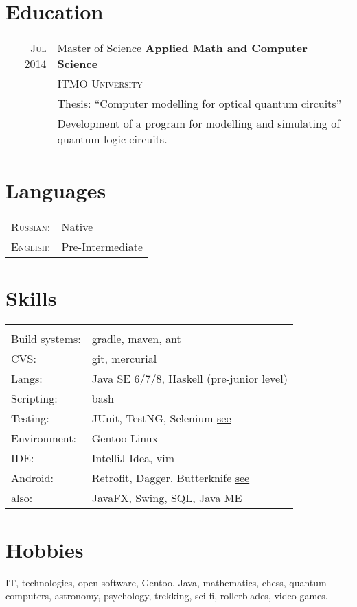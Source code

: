 \documentclass[a4paper,11pt]{article}
\begin{document}
\section{Education}
	\begin{tabular}{rl}	
	  \textsc{Jul 2014} & Master of Science \textbf{ Applied Math and Computer Science} \\& \textsc{ITMO University}\\
			& Thesis: ``Computer modelling for optical quantum circuits''\\&
			Development of a program for modelling and simulating of quantum logic circuits.
	\end{tabular}

\section{Languages}
	\begin{tabular}{ll}
		\textsc{Russian:}&Native\\
		\textsc{English:}&Pre-Intermediate\\
	\end{tabular}

\section{Skills}
	\begin{tabular}{ll}
		\multicolumn{2}{c}{} \\
			Build systems: 	& gradle, maven, ant \\
			CVS: 		& git, mercurial \\
			Langs: 		& Java SE 6/7/8, Haskell (pre-junior level)\\
			Scripting: 	& bash \\ 
			Testing: 	& JUnit, TestNG, Selenium \href{https://github.com/dbudyak/TestRush}{see}\\
			Environment: 	& Gentoo Linux \\
			IDE: 		& IntelliJ Idea, vim \\
			Android:	& Retrofit, Dagger, Butterknife \href{https://github.com/dbudyak/TheTVDB}{see} \\
			also: 		& JavaFX, Swing, SQL, Java ME
	\end{tabular}

\section{Hobbies}
	IT, technologies, open software, Gentoo, Java, mathematics, chess, quantum computers, astronomy, 
	psychology, trekking, sci-fi, rollerblades, video games. 
\end{document}
